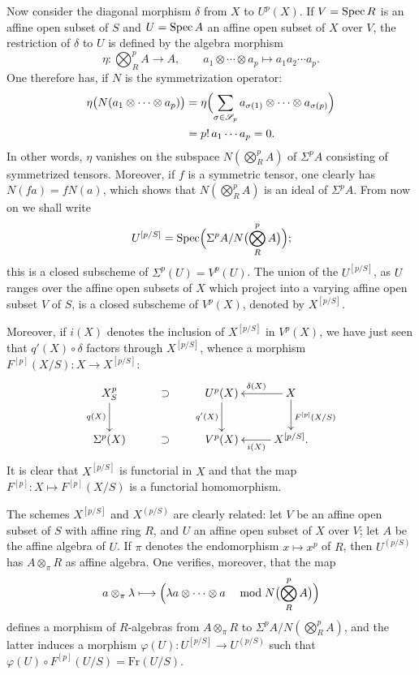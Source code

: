 Now consider the diagonal morphism $\delta$ from $X$ to $U^p(X)$. If $V=\operatorname{Spec} R$ is an affine open subset of $S$ and $U=\operatorname{Spec} A$ an affine open subset of $X$ over $V$, the restriction of $\delta$ to $U$ is defined by the algebra morphism
\[
\eta:\bigotimes_R^p A\longrightarrow A,\qquad a_1\otimes\cdots\otimes a_p\longmapsto a_1a_2\cdots a_p.
\]
One therefore has, if $N$ is the symmetrization operator:
\[
\begin{aligned}
\eta\bigl(N(a_1\otimes\cdots\otimes a_p)\bigr)
&=\eta\Bigl(\sum_{\sigma\in\mathscr S_p}a_{\sigma(1)}\otimes\cdots\otimes a_{\sigma(p)}\Bigr)\\
&=p!\,a_1\cdots a_p=0.
\end{aligned}
\]
In other words, $\eta$ vanishes on the subspace $N(\bigotimes_R^pA)$ of $\Sigma^pA$ consisting of symmetrized tensors. Moreover, if $f$ is a symmetric tensor, one clearly has $N(fa)=fN(a)$, which shows that $N(\bigotimes_R^pA)$ is an ideal of $\Sigma^pA$. From now on we shall write
\[
U^{[p/S]}=\operatorname{Spec}\Bigl(\Sigma^p A/N\bigl(\bigotimes_R^p A\bigr)\Bigr);
\]
this is a closed subscheme of $\Sigma^p(U)=V^p(U)$. The union of the $U^{[p/S]}$, as $U$ ranges over the affine open subsets of $X$ which project into a varying affine open subset $V$ of $S$, is a closed subscheme of $V^p(X)$, denoted by $X^{[p/S]}$.

Moreover, if $i(X)$ denotes the inclusion of $X^{[p/S]}$ in $V^p(X)$, we have just seen that $q'(X)\circ\delta$ factors through $X^{[p/S]}$, whence a morphism $F^{[p]}(X/S):X\to X^{[p/S]}$:
\[
\xymatrix@C=2.5em{X_S^p\ar[d]_{q(X)}&\supset&U^p(X)\ar[d]_{q'(X)}&X\ar[l]_{\delta(X)}\ar[d]^{F^{[p]}(X/S)}\\
\Sigma^p(X)&\supset&V^p(X)&X^{[p/S]}\ar[l]^{i(X)}.}
\]
It is clear that $X^{[p/S]}$ is functorial in $X$ and that the map $F^{[p]}:X\mapsto F^{[p]}(X/S)$ is a functorial homomorphism.

The schemes $X^{[p/S]}$ and $X^{(p/S)}$ are clearly related: let $V$ be an affine open subset of $S$ with affine ring $R$, and $U$ an affine open subset of $X$ over $V$; let $A$ be the affine algebra of $U$. If $\pi$ denotes the endomorphism $x\mapsto x^p$ of $R$, then $U^{(p/S)}$ has $A\otimes_\pi R$ as affine algebra. One verifies, moreover, that the map
\[
a\otimes_\pi\lambda\longmapsto\Bigl(\lambda a\otimes\cdots\otimes a\quad\bmod N\bigl(\bigotimes_R^pA\bigr)\Bigr)
\]
defines a morphism of $R$-algebras from $A\otimes_\pi R$ to $\Sigma^p A/N(\bigotimes_R^pA)$, and the latter induces a morphism $\varphi(U):U^{[p/S]}\to U^{(p/S)}$ such that $\varphi(U)\circ F^{[p]}(U/S)=\mathrm{Fr}(U/S)$.

